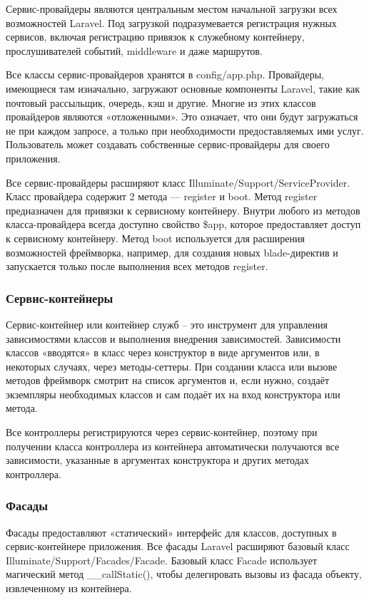 Сервис-провайдеры являются центральным местом начальной загрузки всех возможностей Laravel. Под загрузкой подразумевается регистрация нужных сервисов, включая регистрацию привязок к служебному контейнеру, прослушивателей событий, middleware и даже маршрутов.

Все классы сервис-провайдеров хранятся в config/app.php. Провайдеры, имеющиеся там изначально, загружают основные компоненты Laravel, такие как почтовый рассыльщик, очередь, кэш и другие. Многие из этих классов провайдеров являются «отложенными». Это означает, что они будут загружаться не при каждом запросе, а только при необходимости предоставляемых ими услуг. Пользователь может создавать собственные сервис-провайдеры для своего приложения.

Все сервис-провайдеры расширяют класс Illuminate/Support/ServiceProvider. Класс провайдера содержит 2 метода — register и boot. Метод register предназначен для привязки к сервисному контейнеру. Внутри любого из методов класса-провайдера всегда доступно свойство \$app, которое предоставляет доступ к сервисному контейнеру. Метод boot используется для расширения возможностей фреймворка, например, для создания новых blade-директив и запускается только после выполнения всех методов register.

\subsubsection{Сервис-контейнеры}

Сервис-контейнер или контейнер служб – это инструмент для управления зависимостями классов и выполнения внедрения зависимостей. Зависимости классов «вводятся» в класс через конструктор в виде аргументов или, в некоторых случаях, через методы-сеттеры. При создании класса или вызове методов фреймворк смотрит на список аргументов и, если нужно, создаёт экземпляры необходимых классов и сам подаёт их на вход конструктора или метода. 

Все контроллеры регистрируются через сервис-контейнер, поэтому при получении класса контроллера из контейнера автоматически получаются все зависимости, указанные в аргументах конструктора и других методах контроллера.


\subsubsection{Фасады}

Фасады предоставляют «статический» интерфейс для классов, доступных в сервис-контейнере приложения. Все фасады Laravel расширяют базовый класс Illuminate/Support/Facades/Facade. Базовый класс Facade использует магический метод \_\_callStatic(), чтобы делегировать вызовы из фасада объекту, извлеченному из контейнера.

